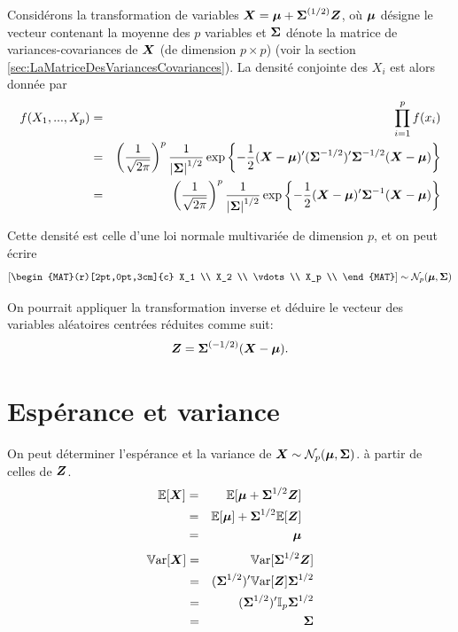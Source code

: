 Considérons la transformation de variables $\boX=\bo\mu + \bo\Sigma^{(1/2)}\bo{Z}$, où $\bo\mu$ désigne le vecteur contenant la moyenne des $p$ variables et $\bo\Sigma$ dénote la matrice de variances-covariances de $\boX$ (de dimension $p \times p$) (voir la section \ref{sec:LaMatriceDesVariancesCovariances}). La densité conjointe des $X_i$ est alors donnée par
\begin{eqnarray}
f(X_1, ..., X_p) &=& \prod_{i=1}^p f(x_i) \nonumber\\
  &=& \left(\frac{1}{\sqrt{2\pi}}\right)^p \frac{1}{\left|\bo\Sigma\right|^{1/2}} \exp\left\{-\frac{1}{2} (\boX- \bo\mu)' (\bo\Sigma^{-1/2})' \bo\Sigma^{-1/2} (\boX- \bo\mu)\right\}\nonumber\\
 &=& \left(\frac{1}{\sqrt{2\pi}}\right)^p \frac{1}{\left|\bo\Sigma\right|^{1/2}} \exp\left\{-\frac{1}{2} (\boX- \bo\mu)' \bo\Sigma^{-1} (\boX- \bo\mu)\right\}
\label{normalemulti}
\end{eqnarray}

Cette densité est celle d'une loi normale multivariée de dimension $p$, et on peut écrire
\begin{eqnarray*}
 \left[
\begin{MAT}(r)[2pt,0pt,3cm]{c}
X_1 \\
X_2 \\
\vdots \\
X_p \\
\end{MAT}
\right] \sim \N_p (\bo\mu, \bo\Sigma)
\end{eqnarray*}

On pourrait appliquer la transformation inverse et déduire le vecteur des variables aléatoires centrées réduites  comme suit: $$\bo Z =  \bo\Sigma^{(-1/2)} (\boX-\bo\mu).$$

\section{Espérance et variance}
\label{sec:EspéranceEtVariance}
On peut déterminer l'espérance et la variance de $\boX\sim\N_p (\bo\mu, \bo\Sigma)$. à partir de celles de $\bo{Z}$.
\begin{eqnarray*}
	\esp[\boX] &=& \esp[\bo{\mu} + \bo\Sigma^{1/2}\bo{Z}]\\
	& =& \esp[\bo\mu]+ \bo\Sigma^{1/2}\esp[\bo{Z}] \\
	&=& \bo\mu
\end{eqnarray*}
\begin{eqnarray*}
	\var[\boX] &=& \var[\bo\Sigma^{1/2}\bo Z] \\
	& = & (\bo\Sigma^{1/2})' \var[\bo Z] \bo\Sigma^{1/2} \\
	&=& (\bo\Sigma^{1/2})' \boI_p \bo\Sigma^{1/2} \\
	&=& \bo\Sigma
\end{eqnarray*}

